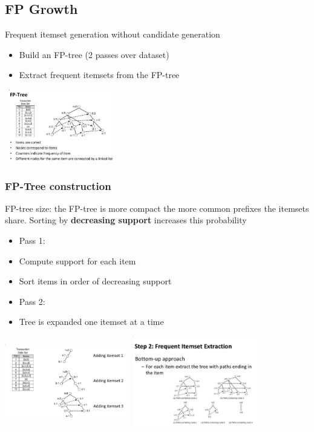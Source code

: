 \subsection{FP Growth}

Frequent itemset generation without candidate generation
\begin{itemize}
\item Build an FP-tree (2 passes over dataset)
\item Extract frequent itemsets from the FP-tree
\end{itemize}

\includegraphics[height=120px, width=190px]{fptree}

\subsubsection{FP-Tree construction}

FP-tree size: the FP-tree is more compact the more common prefixes the
itemsets share. Sorting by \textbf{decreasing support} increases this
probability

\begin{itemize}
\item Pass 1:
  \quad \item Compute support for each item
  \quad \item Sort items in order of decreasing support
\item Pass 2:
  \quad \item Tree is expanded one itemset at a time
\end{itemize}

\includegraphics[height=150px, width=200px]{fpcon}
\includegraphics[height=150px, width=220px]{fpextract}

